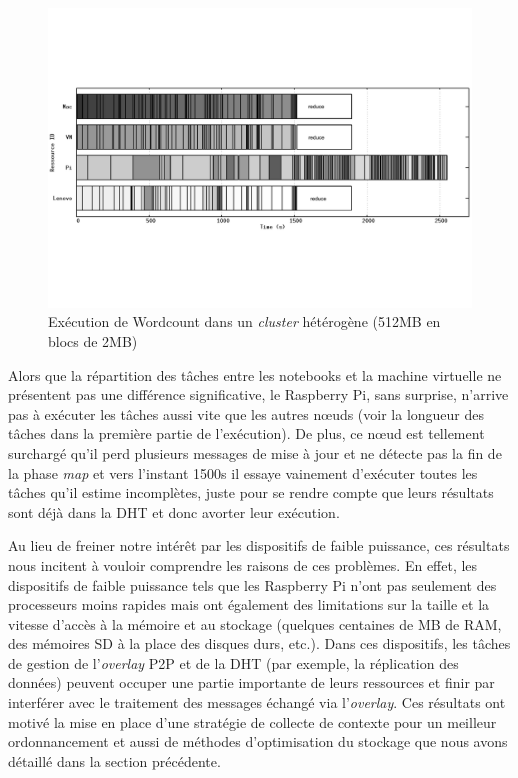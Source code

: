 \begin{figure}
	\centering
		\includegraphics[width=1\linewidth]{img/hetero2}
		\caption{Exécution de Wordcount dans un \textit{cluster} hétérogène (512MB en blocs de 2MB)}\label{fig:hetero}
\end{figure}

Alors que la répartition des tâches entre les notebooks et la machine virtuelle ne présentent pas une différence significative, le Raspberry Pi, sans surprise, n'arrive pas à exécuter les tâches aussi vite que les autres n{\oe}uds (voir la longueur des tâches dans la première partie de l'exécution). De plus, ce n{\oe}ud est tellement surchargé qu'il perd plusieurs messages de mise à jour et ne détecte pas la fin de la phase \textit{map} et vers l'instant 1500s il essaye vainement d'exécuter toutes les tâches qu'il estime incomplètes, juste pour se rendre compte que leurs résultats sont déjà dans la DHT et donc avorter leur exécution. 

Au lieu de freiner notre intérêt par les dispositifs de faible puissance, ces résultats nous incitent à vouloir comprendre les raisons de ces problèmes. En effet, les dispositifs de faible puissance tels que les Raspberry Pi n'ont pas seulement des processeurs moins rapides mais ont également des limitations sur la taille et la vitesse d'accès à la mémoire et au stockage (quelques centaines de MB de RAM, des mémoires SD à la place des disques durs, etc.). Dans ces dispositifs, les tâches de gestion de l'\textit{overlay} P2P et de la DHT (par exemple, la réplication des données) peuvent occuper une partie importante de leurs ressources et finir par interférer avec le traitement des messages échangé via l'\textit{overlay}.  Ces résultats ont motivé la mise en place d'une stratégie de collecte de contexte pour un meilleur ordonnancement et aussi de méthodes d'optimisation du stockage que nous avons détaillé dans la section précédente. 

